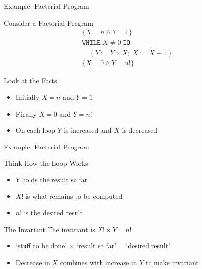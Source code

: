 \begin{frame}{Example: Factorial Program}
    \begin{block}{Consider a Factorial Program}
        \begin{align*}
        \{X=n \wedge Y=1\} \\
        \texttt{WHILE } X \neq 0 \texttt{ DO} \\
        \quad (Y:=Y \times X; \; X:=X-1) \\
        \{X=0 \wedge Y=n!\}
        \end{align*}
    \end{block}


    \begin{block}{Look at the Facts}
        \begin{itemize}
            \item Initially $X=n$ and $Y=1$
            \item Finally $X=0$ and $Y=n!$
            \item On each loop $Y$ is increased and $X$ is decreased
        \end{itemize}
    \end{block}

\end{frame}
\begin{frame}{Example: Factorial Program}
    \begin{block}{Think How the Loop Works}
        \begin{itemize}
            \item $Y$ holds the result so far
            \item $X!$ is what remains to be computed
            \item $n!$ is the desired result
        \end{itemize}
    \end{block}

    \begin{block}{The Invariant}
        The invariant is $X! \times Y = n!$
        \begin{itemize}
            \item `stuff to be done' $\times$ `result so far' = `desired result'
            \item Decrease in $X$ combines with increase in $Y$ to make invariant
        \end{itemize}
    \end{block}
\end{frame}

